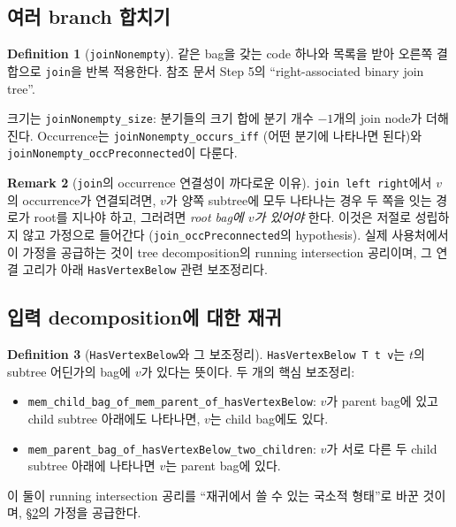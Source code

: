 \documentclass[11pt]{article}
\theoremstyle{definition}
\newtheorem{definition}{Definition}[section]
\newtheorem{remark}[definition]{Remark}
\theoremstyle{plain}
\newcommand{\lean}[1]{\texttt{#1}}
\begin{document}
\subsection{여러 branch 합치기}

\begin{definition}[\lean{joinNonempty}]
\label{nice:def:joinnonempty}
같은 bag을 갖는 code 하나와 목록을 받아 오른쪽 결합으로 \lean{join}을 반복
적용한다. 참조 문서 Step 5의 ``right-associated binary join tree''.
\end{definition}

크기는 \lean{joinNonempty\_size}: 분기들의 크기 합에 분기 개수 $-1$개의 join
node가 더해진다. Occurrence는 \lean{joinNonempty\_occurs\_iff} (어떤 분기에
나타나면 된다)와 \lean{joinNonempty\_occPreconnected}이 다룬다.

\begin{remark}[\lean{join}의 occurrence 연결성이 까다로운 이유]
\label{nice:rem:joinconn}
\lean{join left right}에서 $v$의 occurrence가 연결되려면, $v$가 양쪽 subtree에
모두 나타나는 경우 두 쪽을 잇는 경로가 root를 지나야 하고, 그러려면
\emph{root bag에 $v$가 있어야} 한다. 이것은 저절로 성립하지 않고 가정으로
들어간다 (\lean{join\_occPreconnected}의 hypothesis). 실제 사용처에서 이
가정을 공급하는 것이 tree decomposition의 running intersection 공리이며,
그 연결 고리가 아래 \lean{HasVertexBelow} 관련 보조정리다.
\end{remark}

\subsection{입력 decomposition에 대한 재귀}

\begin{definition}[\lean{HasVertexBelow}와 그 보조정리]
\label{nice:def:hasvertexbelow}
\lean{HasVertexBelow T t v}는 $t$의 subtree 어딘가의 bag에 $v$가 있다는 뜻이다.
두 개의 핵심 보조정리:
\begin{itemize}
  \item \lean{mem\_child\_bag\_of\_mem\_parent\_of\_hasVertexBelow}: $v$가
    parent bag에 있고 child subtree 아래에도 나타나면, $v$는 child bag에도 있다.
  \item \lean{mem\_parent\_bag\_of\_hasVertexBelow\_two\_children}: $v$가 서로
    다른 두 child subtree 아래에 나타나면 $v$는 parent bag에 있다.
\end{itemize}
\end{definition}

이 둘이 running intersection 공리를 ``재귀에서 쓸 수 있는 국소적 형태''로
바꾼 것이며, \S\ref{nice:rem:joinconn}의 가정을 공급한다.
\end{document}
